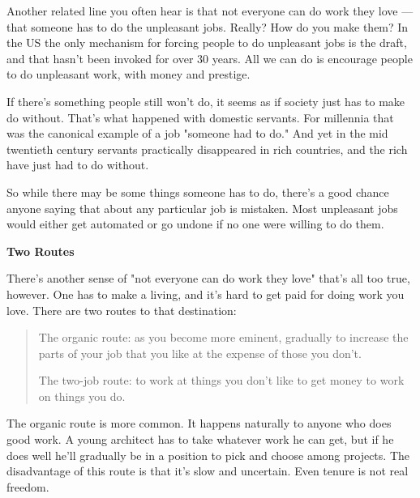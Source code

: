 Another
                    related line you often hear is that not everyone can do work
                    they love --- that someone has to do the unpleasant
                    jobs. Really? How do you make them? In the US the only
                    mechanism for forcing people to do unpleasant jobs is the
                    draft, and that hasn't been invoked for over 30 years. All
                    we can do is encourage people to do unpleasant work, with
                    money and prestige.

If there's something people
                    still won't do, it seems as if society just has to make do
                    without. That's what happened with domestic servants. For
                    millennia that was the canonical example of a job "someone
                    had to do." And yet in the mid twentieth century servants
                    practically disappeared in rich countries, and the rich have
                    just had to do without.

So while there may be
                    some things someone has to do, there's a good chance anyone
                    saying that about any particular job is mistaken. Most
                    unpleasant jobs would either get automated or go undone if
                    no one were willing to do them.

\textbf{Two Routes}

There's another sense of "not everyone can do
                    work they love" that's all too true, however. One has to
                    make a living, and it's hard to get paid for doing work you
                    love. There are two routes to that destination:
                  


                  \begin{quote}

                    The organic route: as you become more eminent, gradually to
                    increase the parts of your job that you like at the expense
                    of those you don't.

The two-job route: to work at
                    things you don't like to get money to work on things you do.
                  
\end{quote}

                  The organic route is more common. It happens naturally to
                  anyone who does good work. A young architect has to take
                  whatever work he can get, but if he does well he'll gradually
                  be in a position to pick and choose among projects. The
                  disadvantage of this route is that it's slow and uncertain.
                  Even tenure is not real freedom.

